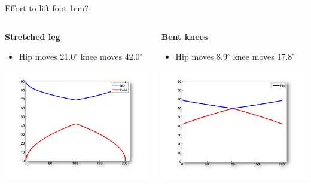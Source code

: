 \documentclass[compress]{beamer}
\begin{document}
\begin{frame}{Effort to lift foot 1cm?}

    \begin{columns}
        \begin{column}{0.5\linewidth}
    \textbf{Stretched leg}

        \begin{itemize}

            \item     Hip moves 21.0$^\circ$ knee moves 42.0$^\circ$
        \end{itemize}

            \begin{center}
                \includegraphics[width=0.8\linewidth]{graph1}
            \end{center}
            
        \end{column}
        \begin{column}{0.5\linewidth}

    \textbf{Bent knees}

        \begin{itemize}

            \item     Hip moves 8.9$^\circ$ knee moves 17.8$^\circ$
        \end{itemize}

            \begin{center}
                \includegraphics[width=0.8\linewidth]{graph2}
            \end{center}


\end{column}
\end{columns}
\end{frame}
\end{document}
